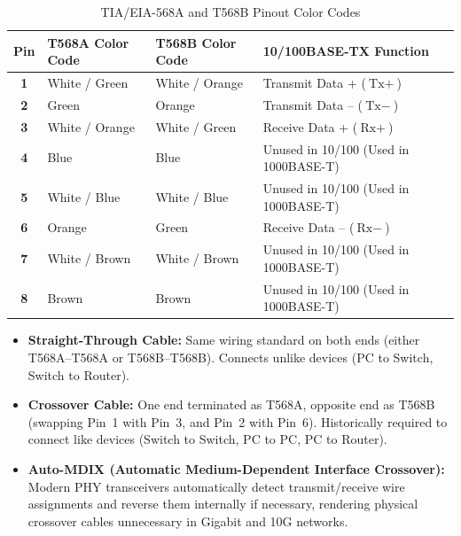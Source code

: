 \begin{table}[H]
\centering
\small
{}
\begin{tabularx}{\linewidth}{c X X l}
\toprule
\rowcolor{tableheadercolor}
\textbf{Pin} & \textbf{T568A Color Code} & \textbf{T568B Color Code} & \textbf{10/100BASE-TX Function} \\
\midrule
\textbf{1} & White / Green & White / Orange & Transmit Data + ($\text{Tx}+$) \\
\textbf{2} & Green & Orange & Transmit Data -- ($\text{Tx}-$) \\
\textbf{3} & White / Orange & White / Green & Receive Data + ($\text{Rx}+$) \\
\textbf{4} & Blue & Blue & Unused in 10/100 (Used in 1000BASE-T) \\
\textbf{5} & White / Blue & White / Blue & Unused in 10/100 (Used in 1000BASE-T) \\
\textbf{6} & Orange & Green & Receive Data -- ($\text{Rx}-$) \\
\textbf{7} & White / Brown & White / Brown & Unused in 10/100 (Used in 1000BASE-T) \\
\textbf{8} & Brown & Brown & Unused in 10/100 (Used in 1000BASE-T) \\
\bottomrule
\end{tabularx}
\caption{TIA/EIA-568A and T568B Pinout Color Codes}
\end{table}

\begin{notebox}
\begin{itemize}[leftmargin=*]
    \item \textbf{Straight-Through Cable:} Same wiring standard on both ends (either T568A--T568A or T568B--T568B). Connects unlike devices (PC to Switch, Switch to Router).
    \item \textbf{Crossover Cable:} One end terminated as T568A, opposite end as T568B (swapping Pin~1 with Pin~3, and Pin~2 with Pin~6). Historically required to connect like devices (Switch to Switch, PC to PC, PC to Router).
    \item \textbf{Auto-MDIX (Automatic Medium-Dependent Interface Crossover):} Modern PHY transceivers automatically detect transmit/receive wire assignments and reverse them internally if necessary, rendering physical crossover cables unnecessary in Gigabit and 10G networks.
\end{itemize}
\end{notebox}

